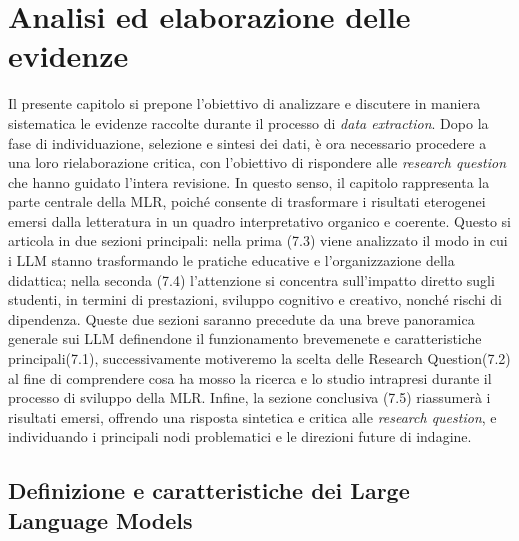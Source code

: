 \documentclass[a4paper,9pt]{article}
\begin{document}
	\section{Analisi ed elaborazione delle evidenze}
	
	Il presente capitolo si prepone l'obiettivo di analizzare e discutere in maniera sistematica le evidenze raccolte durante il processo di \emph{data extraction}. Dopo la fase di individuazione, selezione e sintesi dei dati, è ora necessario procedere a una loro rielaborazione critica, con l’obiettivo di rispondere alle \emph{research question} che hanno guidato l’intera revisione. In questo senso, il capitolo rappresenta la parte centrale della MLR, poiché consente di trasformare i risultati eterogenei emersi dalla letteratura in un quadro interpretativo organico e coerente. Questo si articola in due sezioni principali: nella prima (7.3) viene analizzato il modo in cui i LLM stanno trasformando le pratiche educative e l’organizzazione della didattica; nella seconda (7.4) l’attenzione si concentra sull’impatto diretto sugli studenti, in termini di prestazioni, sviluppo cognitivo e creativo, nonché rischi di dipendenza. Queste due sezioni saranno precedute da una breve panoramica generale sui LLM definendone il funzionamento brevemenete e caratteristiche principali(7.1), successivamente motiveremo la scelta delle Research Question(7.2) al fine di comprendere cosa ha mosso la ricerca e lo studio intrapresi durante il processo di sviluppo della MLR. Infine, la sezione conclusiva (7.5) riassumerà i risultati emersi, offrendo una risposta sintetica e critica alle \emph{research question}, e individuando i principali nodi problematici e le direzioni future di indagine.
	
	\subsection{Definizione e caratteristiche dei Large Language Models}
	
\end{document}
